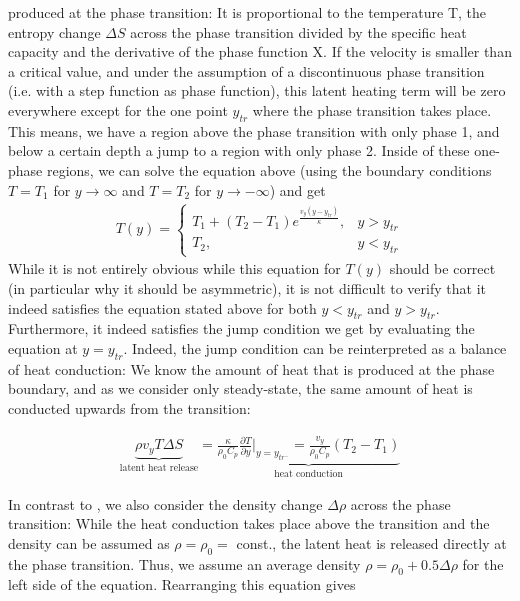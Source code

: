 \documentclass{article}
\begin{document}
produced at the phase transition: It is proportional to the temperature T, the
entropy change $\Delta S$ across the phase transition divided by the specific
heat capacity and the derivative of the phase function X. If the velocity is
smaller than a critical value, and under the assumption of a discontinuous phase
transition (i.e. with a step function as phase function), this latent heating
term will be zero everywhere except for the one point $y_{tr}$ where the phase
transition takes place. This means, we have a region above the phase transition
with only phase 1, and below a certain depth a jump to a region with only phase
2. Inside of these one-phase regions, we can solve the equation above (using the
boundary conditions $T=T_1$ for $y \rightarrow \infty $ and $T=T_2$ for $y
\rightarrow -\infty $) and get
\begin{align*}
T(y) =\begin{cases}
T_1 + (T_2-T_1) e^{\frac{v_y (y-y_{tr})}{\kappa}}, & y>y_{tr}\\
T_2, & y<y_{tr}
\end{cases}
\end{align*}
While it is not entirely obvious while this equation for $T(y)$ should be
correct (in particular why it should be asymmetric), it is not difficult to
verify that it indeed satisfies the equation stated above for both $y<y_{tr}$
and $y>y_{tr}$. Furthermore, it indeed satisfies the jump condition we get by
evaluating the equation at $y=y_{tr}$.
Indeed, the jump condition can be reinterpreted as a balance of heat conduction:
We know the amount of heat that is produced at the phase boundary, and as
we consider only steady-state, the same amount of heat is conducted upwards from
the transition:

\begin{gather*}
\underbrace{\rho v_y T \Delta S}_{\text{latent heat release}} = \underbrace{\frac{\kappa}{\rho_0 C_p} \frac{\partial T}{\partial y} \vert_{y=y_{tr^-}} = \frac{v_y}{\rho_0 C_p} (T_2-T_1)}_{\text{heat conduction}}
\end{gather*}

In contrast to \cite{STO01}, we also consider the density change $\Delta\rho$ across the phase transition: While the heat conduction takes place above the transition and the density can be assumed as $\rho=\rho_0=$ const., the latent heat is released directly at the phase transition. Thus, we assume an average density $\rho=\rho_0 + 0.5\Delta\rho$ for the left side of the equation. Rearranging this equation gives
\end{document}
